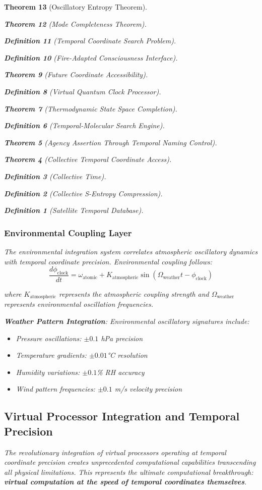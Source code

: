 \documentclass[12pt,a4paper]{article}
\newtheorem{theorem}{Theorem}[section]
\newtheorem{definition}[theorem]{Definition}
\begin{document}
\begin{theorem}[Oscillatory Entropy Theorem]
\begin{theorem}[Mode Completeness Theorem]
\begin{enumerate}
\begin{definition}[Temporal Coordinate Search Problem]
\begin{algorithm}
\begin{definition}[Fire-Adapted Consciousness Interface]
\begin{theorem}[Future Coordinate Accessibility]
\begin{definition}[Virtual Quantum Clock Processor]
\begin{itemize}
\begin{itemize}
\begin{theorem}[Thermodynamic State Space Completion]
\begin{definition}[Temporal-Molecular Search Engine]
\begin{theorem}[Agency Assertion Through Temporal Naming Control]
\begin{remark}
\begin{theorem}[Collective Temporal Coordinate Access]
\begin{definition}[Collective Time]
\begin{definition}[Collective S-Entropy Compression]
\begin{definition}[Satellite Temporal Database]
\begin{algorithm}
\begin{table}[h]
{\subsubsection{Environmental Coupling Layer}

The environmental integration system correlates atmospheric oscillatory dynamics with temporal coordinate precision. Environmental coupling follows:
$$\frac{d\phi_{\text{clock}}}{dt} = \omega_{\text{atomic}} + K_{\text{atmospheric}} \sin(\Omega_{\text{weather}} t - \phi_{\text{clock}})$$

where $K_{\text{atmospheric}}$ represents the atmospheric coupling strength and $\Omega_{\text{weather}}$ represents environmental oscillation frequencies.

\textbf{Weather Pattern Integration}: Environmental oscillatory signatures include:
\begin{itemize}
\item Pressure oscillations: $\pm 0.1$ hPa precision
\item Temperature gradients: $\pm 0.01$°C resolution
\item Humidity variations: $\pm 0.1$\% RH accuracy
\item Wind pattern frequencies: $\pm 0.1$ m/s velocity precision
\end{itemize}

\subsection{Virtual Processor Integration and Temporal Precision}

The revolutionary integration of virtual processors operating at temporal coordinate precision creates unprecedented computational capabilities transcending all physical limitations. This represents the ultimate computational breakthrough: \textbf{virtual computation at the speed of temporal coordinates themselves}.

}
\end{table}
\end{algorithm}
\end{definition}
\end{definition}
\end{definition}
\end{theorem}
\end{remark}
\end{theorem}
\end{definition}
\end{theorem}
\end{itemize}
\end{itemize}
\end{definition}
\end{theorem}
\end{definition}
\end{algorithm}
\end{definition}
\end{enumerate}
\end{theorem}
\end{theorem}
\end{document}
